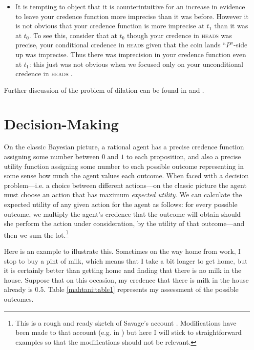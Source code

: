 \begin{itemize}
  \item It is tempting to object that it is counterintuitive for an increase in evidence to leave your credence function more imprecise than it was before. However it is not obvious that your credence function is more imprecise at $t_1$ than it was at $t_0$. To see this, consider that at $t_0$ though your credence in \textsc{heads} was precise, your conditional credence in \textsc{heads} given that the coin lands ``$P$''-side up was imprecise. Thus there was imprecision in your credence function even at $t_1$: this just was not obvious when we focused only on your unconditional credence in \textsc{heads} \citep{bradleyMS}.
\end{itemize}
	

Further discussion of the problem of dilation can be found in \citet{bradleyMS,bradleysteele2014a,dodd2013,Joyce2010} and \citet{pedersonwheeler2014}.


\section{Decision-Making}

On the classic Bayesian picture, a rational agent has a precise credence function assigning some number between $0$ and $1$ to each proposition, and also a precise utility function assigning some number to each possible outcome representing in some sense how much the agent values each outcome. When faced with a decision problem---i.e. a choice between different actions---on the classic picture the agent must choose an action that has maximum \textit{expected utility}. We can calculate the expected utility of any given action for the agent as follows: for every possible outcome, we multiply the agent's credence that the outcome will obtain should she perform the action under consideration, by the utility of that outcome---and then we sum the lot.\footnote{This is a rough and ready sketch of Savage's account \citep{Savage1954}. Modifications have been made to that account (e.g. in \citealp{jeffrey1965}) but here I will stick to straightforward examples so that the modifications should not be relevant.} 
  
Here is an example to illustrate this. Sometimes on the way home from work, I stop to buy a pint of milk, which means that I take a bit longer to get home, but it is certainly better than getting home and finding that there is no milk in the house. Suppose that on this occasion, my credence that there is milk in the house already is $0.5$. Table \ref{mahtani:table1} represents my assessment of the possible outcomes. 

